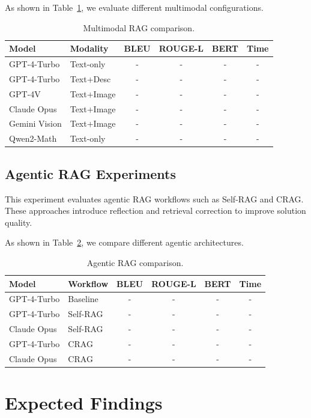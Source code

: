 \documentclass[11pt]{article}
\begin{document}
As shown in Table~\ref{tab:e4}, we evaluate different multimodal configurations.

\begin{table}[t]
\centering
\scriptsize
\begin{tabular}{llcccc}
\toprule
Model & Modality & BLEU & ROUGE-L & BERT & Time \\
\midrule
GPT-4-Turbo & Text-only & - & - & - & - \\
GPT-4-Turbo & Text+Desc & - & - & - & - \\
GPT-4V & Text+Image & - & - & - & - \\
Claude Opus & Text+Image & - & - & - & - \\
Gemini Vision & Text+Image & - & - & - & - \\
Qwen2-Math & Text-only & - & - & - & - \\
\bottomrule
\end{tabular}
\caption{Multimodal RAG comparison.}
\label{tab:e4}
\end{table}

\subsection{Agentic RAG Experiments}

This experiment evaluates agentic RAG workflows such as Self-RAG and CRAG. These approaches introduce reflection and retrieval correction to improve solution quality.

As shown in Table~\ref{tab:e5}, we compare different agentic architectures.

\begin{table}[t]
\centering
\scriptsize
\begin{tabular}{llcccc}
\toprule
Model & Workflow & BLEU & ROUGE-L & BERT & Time \\
\midrule
GPT-4-Turbo & Baseline & - & - & - & - \\
GPT-4-Turbo & Self-RAG & - & - & - & - \\
Claude Opus & Self-RAG & - & - & - & - \\
GPT-4-Turbo & CRAG & - & - & - & - \\
Claude Opus & CRAG & - & - & - & - \\
\bottomrule
\end{tabular}
\caption{Agentic RAG comparison.}
\label{tab:e5}
\end{table}

\section{Expected Findings}
\end{document}
